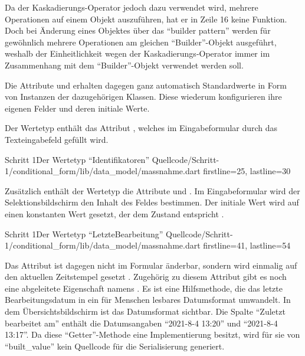 Da der Kaskadierungs-Operator jedoch dazu verwendet wird, mehrere Operationen auf einem Objekt auszuführen, hat er in Zeile 16 keine Funktion.
Doch bei Änderung eines Objektes über das \enquote{builder pattern} werden für gewöhnlich mehrere Operationen am gleichen \enquote{Builder}-Objekt ausgeführt, weshalb der Einheitlichkeit wegen der Kaskadierungs-Operator immer im Zusammenhang mit dem \enquote{Builder}-Objekt verwendet werden soll.

Die Attribute  und   erhalten dagegen ganz automatisch Standardwerte in Form von Instanzen der dazugehörigen Klassen.
Diese wiederum konfigurieren ihre eigenen Felder und deren initiale Werte.



Der Wertetyp  enthält das Attribut  ,
welches im Eingabeformular durch das Texteingabefeld gefüllt wird.

\begin{alexlisting}{Schritt 1}{Der Wertetyp \enquote{Identifikatoren}}
  {Quellcode/Schritt-1/conditional_form/lib/data_model/massnahme.dart}
  {firstline=25, lastline=30}
  \label{lst:Schritt1WerteTypIdentifikatoren}
\end{alexlisting}

Zusätzlich enthält der Wertetyp  die Attribute
 
und  .
Im Eingabeformular wird der Selektionsbildschirm den Inhalt des Feldes  bestimmen.
Der initiale Wert wird auf einen konstanten Wert gesetzt, der dem Zustand  entspricht .

\begin{alexlisting}{Schritt 1}{Der Wertetyp \enquote{LetzteBearbeitung}}
  {Quellcode/Schritt-1/conditional_form/lib/data_model/massnahme.dart}
  {firstline=41, lastline=54}
  \label{lst:Schritt1WerteTypLetzteBearbeitung}
\end{alexlisting}

Das Attribut  ist dagegen nicht im Formular änderbar,
sondern wird einmalig auf den aktuellen Zeitstempel gesetzt .
Zugehörig zu diesem Attribut gibt es noch eine abgeleitete Eigenschaft namens  .
Es ist eine Hilfsmethode, die das letzte Bearbeitungsdatum in ein für Menschen lesbares Datumsformat umwandelt.
In dem Übersichtsbildschirm  ist das Datumsformat sichtbar.
Die Spalte \enquote{Zuletzt bearbeitet am} enthält die Datumsangaben \enquote{2021-8-4 13:20} und \enquote{2021-8-4 13:17}. 
Da diese \enquote{Getter}-Methode eine Implementierung besitzt, wird für sie von \enquote{built_value} kein Quellcode für die Serialisierung generiert. 


